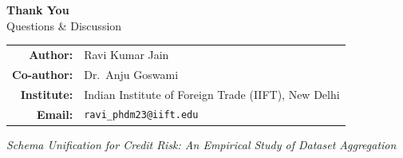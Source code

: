 \documentclass[9pt,aspectratio=169]{beamer}
\begin{document}
\begin{frame}
  \begin{center}
    \vspace{1.0cm}
    {\Large\bfseries Thank You}\\[8pt]
    {\normalsize Questions \& Discussion}

    \vspace{0.8cm}
    \footnotesize
    \begin{tabular}{rl}
      \textbf{Author:}    & Ravi Kumar Jain\\
      \textbf{Co-author:} & Dr.\ Anju Goswami\\
      \textbf{Institute:} & Indian Institute of Foreign Trade (IIFT), New Delhi\\
      \textbf{Email:}     & \texttt{ravi\_phdm23@iift.edu}\\
    \end{tabular}

    \vspace{0.7cm}
    \small\textit{Schema Unification for Credit Risk: An Empirical Study of Dataset Aggregation}
  \end{center}
\end{frame}
\end{document}
